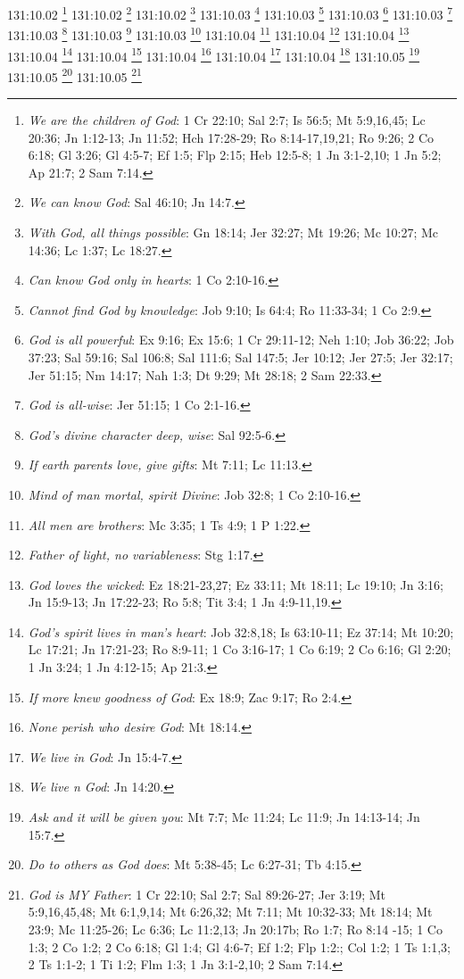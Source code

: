 {{{{{{{{{{{{{{{{{{{{{{{{{{{{{{131:10.02 \footnote{\textit{We are the children of God}: 1 Cr 22:10; Sal 2:7; Is 56:5; Mt 5:9,16,45; Lc 20:36; Jn 1:12-13; Jn 11:52; Hch 17:28-29; Ro 8:14-17,19,21; Ro 9:26; 2 Co 6:18; Gl 3:26; Gl 4:5-7; Ef 1:5; Flp 2:15; Heb 12:5-8; 1 Jn 3:1-2,10; 1 Jn 5:2; Ap 21:7; 2 Sam 7:14.}
131:10.02 \footnote{\textit{We can know God}: Sal 46:10; Jn 14:7.}
131:10.02 \footnote{\textit{With God, all things possible}: Gn 18:14; Jer 32:27; Mt 19:26; Mc 10:27; Mc 14:36; Lc 1:37; Lc 18:27.}
131:10.03 \footnote{\textit{Can know God only in hearts}: 1 Co 2:10-16.}
131:10.03 \footnote{\textit{Cannot find God by knowledge}: Job 9:10; Is 64:4; Ro 11:33-34; 1 Co 2:9.}
131:10.03 \footnote{\textit{God is all powerful}: Ex 9:16; Ex 15:6; 1 Cr 29:11-12; Neh 1:10; Job 36:22; Job 37:23; Sal 59:16; Sal 106:8; Sal 111:6; Sal 147:5; Jer 10:12; Jer 27:5; Jer 32:17; Jer 51:15; Nm 14:17; Nah 1:3; Dt 9:29; Mt 28:18; 2 Sam 22:33.}
131:10.03 \footnote{\textit{God is all-wise}: Jer 51:15; 1 Co 2:1-16.}
131:10.03 \footnote{\textit{God's divine character deep, wise}: Sal 92:5-6.}
131:10.03 \footnote{\textit{If earth parents love, give gifts}: Mt 7:11; Lc 11:13.}
131:10.03 \footnote{\textit{Mind of man mortal, spirit Divine}: Job 32:8; 1 Co 2:10-16.}
131:10.04 \footnote{\textit{All men are brothers}: Mc 3:35; 1 Ts 4:9; 1 P 1:22.}
131:10.04 \footnote{\textit{Father of light, no variableness}: Stg 1:17.}
131:10.04 \footnote{\textit{God loves the wicked}: Ez 18:21-23,27; Ez 33:11; Mt 18:11; Lc 19:10; Jn 3:16; Jn 15:9-13; Jn 17:22-23; Ro 5:8; Tit 3:4; 1 Jn 4:9-11,19.}
131:10.04 \footnote{\textit{God's spirit lives in man's heart}: Job 32:8,18; Is 63:10-11; Ez 37:14; Mt 10:20; Lc 17:21; Jn 17:21-23; Ro 8:9-11; 1 Co 3:16-17; 1 Co 6:19; 2 Co 6:16; Gl 2:20; 1 Jn 3:24; 1 Jn 4:12-15; Ap 21:3.}
131:10.04 \footnote{\textit{If more knew goodness of God}: Ex 18:9; Zac 9:17; Ro 2:4.}
131:10.04 \footnote{\textit{None perish who desire God}: Mt 18:14.}
131:10.04 \footnote{\textit{We live in God}: Jn 15:4-7.}
131:10.04 \footnote{\textit{We live n God}: Jn 14:20.}
131:10.05 \footnote{\textit{Ask and it will be given you}: Mt 7:7; Mc 11:24; Lc 11:9; Jn 14:13-14; Jn 15:7.}
131:10.05 \footnote{\textit{Do to others as God does}: Mt 5:38-45; Lc 6:27-31; Tb 4:15.}
131:10.05 \footnote{\textit{God is MY Father}: 1 Cr 22:10; Sal 2:7; Sal 89:26-27; Jer 3:19; Mt 5:9,16,45,48; Mt 6:1,9,14; Mt 6:26,32; Mt 7:11; Mt 10:32-33; Mt 18:14; Mt 23:9; Mc 11:25-26; Lc 6:36; Lc 11:2,13; Jn 20:17b; Ro 1:7; Ro 8:14 -15; 1 Co 1:3; 2 Co 1:2; 2 Co 6:18; Gl 1:4; Gl 4:6-7; Ef 1:2; Flp 1:2:; Col 1:2; 1 Ts 1:1,3; 2 Ts 1:1-2; 1 Ti 1:2; Flm 1:3; 1 Jn 3:1-2,10; 2 Sam 7:14.}
}}}}}}}}}}}}}}}}}}}}}}}}}}}}}}
